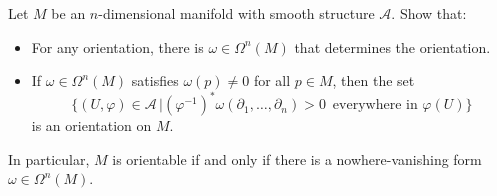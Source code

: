 \documentclass{ximera}
\begin{document}
    \begin{exercise}
        Let $M$ be an $n$-dimensional manifold with smooth structure $\mathcal{A}$. Show that:
        \begin{itemize}
            \item For any orientation, there is $\omega \in \Omega ^n (M)$ that determines the orientation.
            \item If $\omega \in \Omega ^n (M)$ satisfies $\omega (p) \neq 0$ for all $p \in M$, then the set 
            \[   \{   (U , \varphi )   \in \mathcal{A}  \, \vert  (\varphi ^{-1} )^{\ast} \omega (\partial _1  , \ldots , \partial _n ) > 0  \, \text{ everywhere in } \varphi (U) \}                \]
            is an orientation on $M$.
        \end{itemize}
        In particular, $M$ is orientable if and only if there is a nowhere-vanishing form $\omega \in \Omega ^n (M)$.
    \end{exercise}
\end{document}
